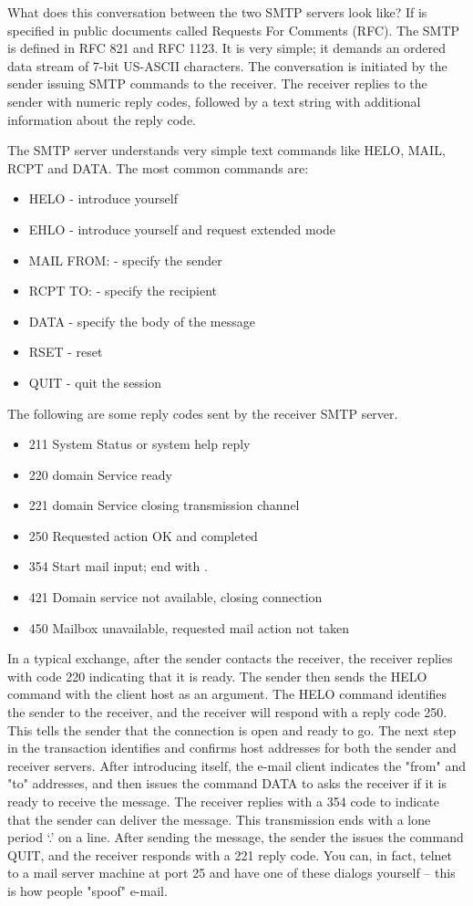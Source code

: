 What does this conversation between the two SMTP servers look like?
If is specified in public documents
called Requests For Comments (RFC).
The SMTP is defined in RFC 821 and RFC 1123.
It is very simple; it demands an ordered data stream of 
7-bit US-ASCII characters.
The conversation is initiated by the sender issuing SMTP commands to
the receiver. 
The receiver replies to the sender with numeric reply codes, 
followed by a text string with additional information about the reply code.

The SMTP server understands very simple text commands like HELO, MAIL, 
RCPT and DATA. The most common commands are:

\begin{itemize}
\item HELO - introduce yourself
\item EHLO - introduce yourself and request extended mode
\item MAIL FROM: - specify the sender
\item RCPT TO: - specify the recipient
\item DATA - specify the body of the message 
\item RSET - reset
\item QUIT - quit the session
\end{itemize}

The following are some reply codes sent by the receiver SMTP server.

\begin{itemize}
\item 211  	System Status or system help reply
\item 220 	domain Service ready
\item 221 	domain Service closing transmission channel
\item 250 	Requested action OK and completed
\item 354 	Start mail input; end with .
\item 421 	Domain service not available, closing connection
\item 450 	Mailbox unavailable, requested mail action not taken
\end{itemize}

In a typical exchange, after the sender contacts the receiver,
the receiver replies with code 220 indicating that it is ready. 
The sender then sends the HELO command with the client host as an argument. 
The HELO command identifies the sender to the receiver, 
and the receiver will respond with a reply code 250. 
This tells the sender that the connection is open and ready to go. 
The next step in the transaction identifies and confirms host addresses 
for both the sender and receiver servers.
After introducing itself, the e-mail client 
indicates the "from" and "to" addresses, and then 
issues the command DATA to asks the receiver if it is ready to receive the 
message.
The receiver replies with a 354 code to indicate that the 
sender can deliver the message.
This transmission ends with a lone period `.' on a line. 
After sending the message, the sender the issues the command QUIT,
and the receiver responds with a 221 reply code.
You can, in fact, telnet to a mail server machine at port 25 and have 
one of these dialogs yourself -- this is how people "spoof" e-mail.


